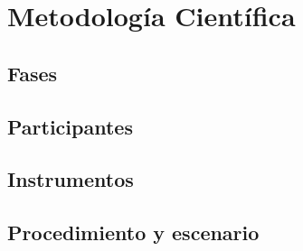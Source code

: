 \section{Metodología Científica}
    \subsection{Fases}
    \subsection{Participantes}
    \subsection{Instrumentos}
    \subsection{Procedimiento y escenario}